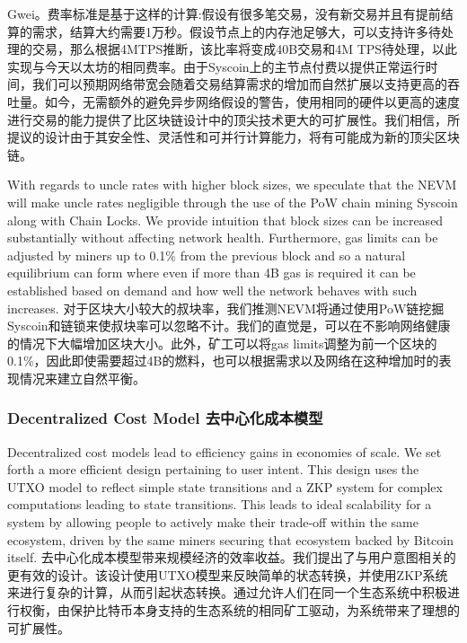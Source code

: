 \documentclass{ctexart}
\begin{document}
Gwei。费率标准是基于这样的计算:假设有很多笔交易，没有新交易并且有提前结算的需求，结算大约需要1万秒。假设节点上的内存池足够大，可以支持许多待处理的交易，那么根据4MTPS推断，该比率将变成40B交易和4M TPS待处理，以此实现与今天以太坊的相同费率。由于Syscoin上的主节点付费以提供正常运行时间，我们可以预期网络带宽会随着交易结算需求的增加而自然扩展以支持更高的吞吐量。如今，无需额外的避免异步网络假设的警告，使用相同的硬件以更高的速度进行交易的能力提供了比区块链设计中的顶尖技术更大的可扩展性。我们相信，所提议的设计由于其安全性、灵活性和可并行计算能力，将有可能成为新的顶尖区块链。

With regards to uncle rates with higher block sizes, we speculate that the NEVM will make uncle rates negligible through the use of the PoW chain mining Syscoin along with Chain Locks. We provide intuition that block sizes can be increased substantially without affecting network health. Furthermore, gas limits can be adjusted by miners up to 0.1\% from the previous block and so a natural equilibrium can form where even if more than 4B gas is required it can be established based on demand and how well the network behaves with such increases. 对于区块大小较大的叔块率，我们推测NEVM将通过使用PoW链挖掘Syscoin和链锁来使叔块率可以忽略不计。我们的直觉是，可以在不影响网络健康的情况下大幅增加区块大小。此外，矿工可以将gas limits调整为前一个区块的0.1\%，因此即使需要超过4B的燃料，也可以根据需求以及网络在这种增加时的表现情况来建立自然平衡。

\subsubsection{Decentralized Cost Model 去中心化成本模型}

Decentralized cost models lead to efficiency gains in economies of scale. We set forth a more efficient design pertaining to user intent. This design uses the UTXO model to reflect simple state transitions and a ZKP system for complex computations leading to state transitions. This leads to ideal scalability for a system by allowing people to actively make their trade-off within the same ecosystem, driven by the same miners securing that ecosystem backed by Bitcoin itself. 去中心化成本模型带来规模经济的效率收益。我们提出了与用户意图相关的更有效的设计。该设计使用UTXO模型来反映简单的状态转换，并使用ZKP系统来进行复杂的计算，从而引起状态转换。通过允许人们在同一个生态系统中积极进行权衡，由保护比特币本身支持的生态系统的相同矿工驱动，为系统带来了理想的可扩展性。
\end{document}
